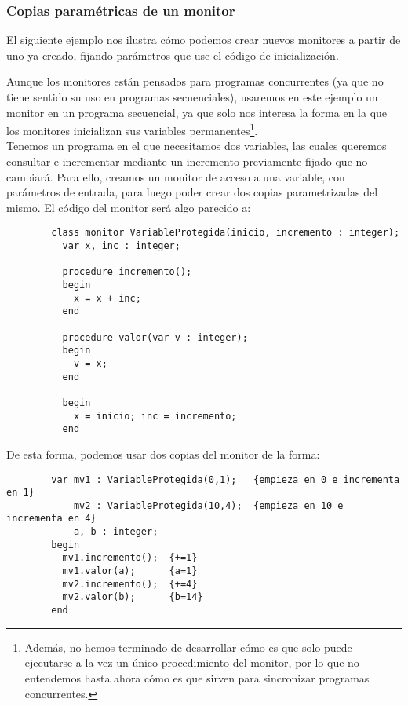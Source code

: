 \subsubsection{Copias paramétricas de un monitor}
El siguiente ejemplo nos ilustra cómo podemos crear nuevos monitores a partir de uno ya creado, fijando parámetros que use el código de inicialización.

\begin{ejemplo}
    Aunque los monitores están pensados para programas concurrentes (ya que no tiene sentido su uso en programas secuenciales), usaremos en este ejemplo un monitor en un programa secuencial, ya que solo nos interesa la forma en la que los monitores inicializan sus variables permanentes\footnote{Además, no hemos terminado de desarrollar cómo es que solo puede ejecutarse a la vez un único procedimiento del monitor, por lo que no entendemos hasta ahora cómo es que sirven para sincronizar programas concurrentes.}.\\

    Tenemos un programa en el que necesitamos dos variables, las cuales queremos consultar e incrementar mediante un incremento previamente fijado que no cambiará. Para ello, creamos un monitor de acceso a una variable, con parámetros de entrada, para luego poder crear dos copias parametrizadas del mismo. El código del monitor será algo parecido a:
    \begin{verbatim}
        class monitor VariableProtegida(inicio, incremento : integer);
          var x, inc : integer;

          procedure incremento();
          begin
            x = x + inc;
          end

          procedure valor(var v : integer);
          begin
            v = x;
          end
          
          begin
            x = inicio; inc = incremento;
          end
    \end{verbatim}
    De esta forma, podemos usar dos copias del monitor de la forma:
    \begin{verbatim}
        var mv1 : VariableProtegida(0,1);   {empieza en 0 e incrementa en 1}
            mv2 : VariableProtegida(10,4);  {empieza en 10 e incrementa en 4}
            a, b : integer;
        begin
          mv1.incremento();  {+=1}
          mv1.valor(a);      {a=1}
          mv2.incremento();  {+=4}
          mv2.valor(b);      {b=14}
        end
    \end{verbatim}
\end{ejemplo}

